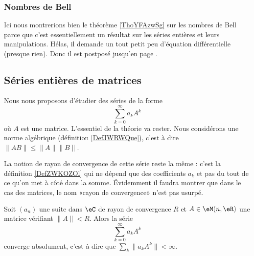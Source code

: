 \subsubsection{Nombres de Bell}

Ici nous montrerions bien le théorème \ref{ThoYFAzwSg} sur les nombres de Bell parce que c'est essentiellement un résultat sur les séries entières et leurs manipulations. Hélas, il demande un tout petit peu d'équation différentielle (presque rien). Donc il est postposé jusqu'en page \pageref{ThoYFAzwSg}.

\subsection{Séries entières de matrices}
\label{subsecEVnZXgf}

Nous nous proposons d'étudier des séries de la forme
\begin{equation}
    \sum_{k=0}^{\infty}a_kA^k
\end{equation}
où \( A\) est une matrice. L'essentiel de la théorie va rester. Nous considérons une norme algébrique (définition \ref{DefJWRWQue}), c'est à dire \( \| AB \|\leq \| A \|\| B \|\).

La notion de rayon de convergence de cette série reste la même : c'est la définition \ref{DefZWKOZOl} qui ne dépend que des coefficients \( a_k\) et pas du tout de ce qu'on met à côté dans la somme. Évidemment il faudra montrer que dans le cas des matrices, le nom «rayon de convergence» n'est pas usurpé.

\begin{proposition} \label{PropFIPooSSmJDQ}
    Soit \( (a_n)\) une suite dans \( \eC\) de rayon de convergence \( R\) et \( A\in \eM(n,\eR)\) une matrice vérifiant \( \| A \|<R\). Alors la série
    \begin{equation}
        \sum_{k=0}^{\infty}a_kA^k
    \end{equation}
    converge absolument, c'est à dire que \( \sum_k\| a_kA^k \|<\infty\).
\end{proposition}

